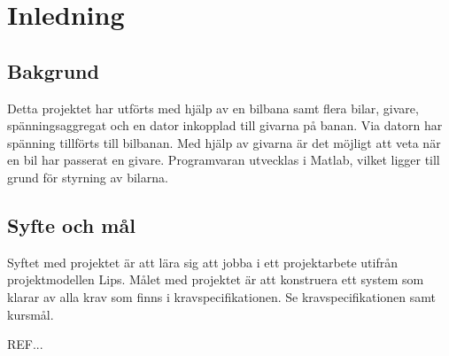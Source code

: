 \section{Inledning}

\subsection{Bakgrund} Detta projektet har utförts med hjälp av en bilbana samt
flera bilar, givare, spänningsaggregat och en dator inkopplad till givarna på
banan. Via datorn har spänning tillförts till bilbanan. Med hjälp av givarna är
det möjligt att veta när en bil har passerat en givare.  Programvaran utvecklas
i Matlab, vilket ligger till grund för styrning av bilarna.

\subsection{Syfte och mål}

Syftet med projektet är att lära sig att jobba i ett projektarbete utifrån projektmodellen Lips. Målet med projektet är att konstruera ett system som klarar av alla krav som finns i kravspecifikationen. Se kravspecifikationen samt kursmål.

REF...